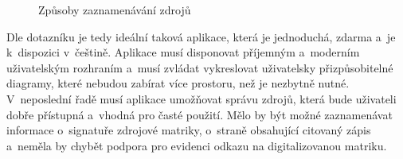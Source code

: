 	\begin{figure}[H]
		\begin{bchart}[min=0,steps={5, 20, 40, 80, 120},max=140]
				\smallskip
				\smallskip
				\smallskip
				\smallskip
		\end{bchart}
		\caption{Způsoby zaznamenávání zdrojů}
		\label{chart:srchow}
	\end{figure}
	Dle dotazníku je tedy ideální taková aplikace, která je jednoduchá, zdarma a~je k~dispozici v~češtině. Aplikace musí disponovat příjemným a~moderním uživatelským rozhraním a~musí zvládat vykreslovat uživatelsky přizpůsobitelné diagramy, které nebudou zabírat více prostoru, než je nezbytně nutné. V~neposlední řadě musí aplikace umožňovat správu zdrojů, která bude uživateli dobře přístupná a~vhodná pro časté použití. Mělo by být možné zaznamenávat informace o~signatuře zdrojové matriky, o~straně obsahující citovaný zápis a~neměla by chybět podpora pro evidenci odkazu na digitalizovanou matriku. \par
	
	
